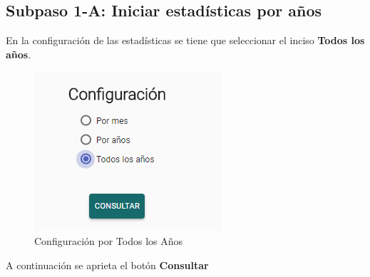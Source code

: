 \subsection{Subpaso 1-A: Iniciar estadísticas por años}
	En la configuración de las estadísticas se tiene que seleccionar el 
	inciso \textbf{Todos los años}.
		
	\begin{figure}[hbtp]

	\includegraphics[scale=0.5]{images/Interfaz/IUGS15_configuracioTodos.PNG}
	\caption{Configuración por Todos los Años }
	\end{figure}
	A continuación se aprieta el botón \textbf{Consultar}
	
